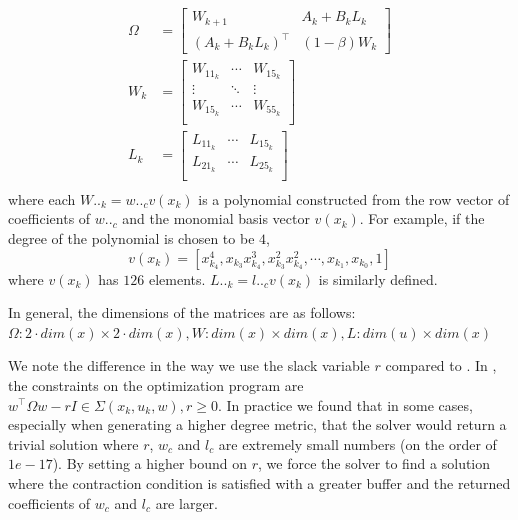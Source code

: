\documentclass[journal]{IEEEtran}
\begin{document}
\begin{equation}
	\label{eq:dccm_opt_params}
	\begin{aligned}
	\Omega &=
	\begin{bmatrix}
		W_{k+1} & A_k + B_k L_k \\
		(A_k + B_k L_k)^\top & (1 - \beta) W_k
	\end{bmatrix} \\
	W_k &= 
	\begin{bmatrix}
		W_{11_k} & \cdots & W_{15_k} \\
		\vdots & \ddots & \vdots \\
		W_{15_k} & \cdots & W_{55_k} \\
	\end{bmatrix} \\
	L_k &=
	\begin{bmatrix}
		L_{11_k} & \cdots & L_{15_k} \\
		L_{21_k} & \cdots & L_{25_k} \\
	\end{bmatrix} \\
	\end{aligned}
\end{equation}
where each $W.._{k} = w.._c v(x_k)$ is a polynomial constructed from the row vector of coefficients of $w.._c$ and the monomial basis vector $v(x_k)$. For example, if the degree of the polynomial is chosen to be $4$,
\begin{equation}
	v(x_k) = [x^4_{k_4}, x_{k_3}x^3_{k_4}, x^2_{k_3}x^2_{k_4}, \cdots ,x_{k_1}, x_{k_0}, 1]
\end{equation}
where $v(x_k)$ has $126$ elements. $L.._k = l.._c v(x_k)$ is similarly defined.

In general, the dimensions of the matrices are as follows: $\Omega: 2 \cdot dim(x) \times 2 \cdot dim(x), W: dim(x) \times dim(x), L: dim(u) \times dim(x)$

We note the difference in the way we use the slack variable $r$ compared to \autocite{weiControlContractionMetric2021}. In \autocite{weiControlContractionMetric2021}, the constraints on the optimization program are $w^\top \Omega w - r I \in \Sigma(x_k, u_k, w), r \geq 0$. In practice we found that in some cases, especially when generating a higher degree metric, that the solver would return a trivial solution where $r$, $w_c$ and $l_c$ are extremely small numbers (on the order of $1e-17$). By setting a higher bound on $r$, we force the solver to find a solution where the contraction condition is satisfied with a greater buffer and the returned coefficients of $w_c$ and $l_c$ are larger.
\end{document}
